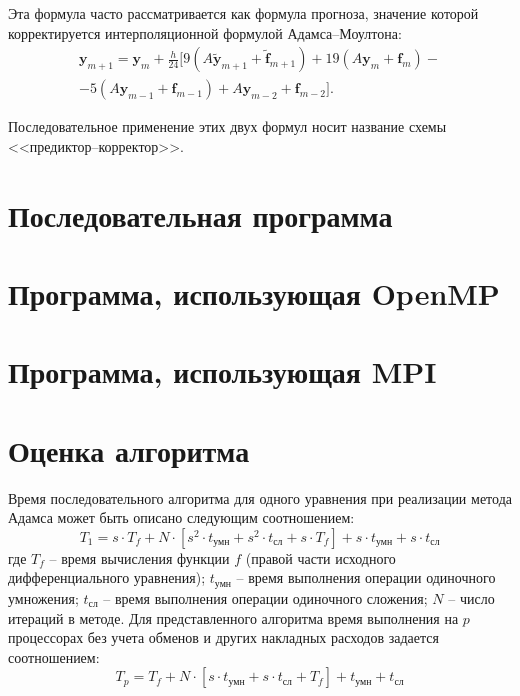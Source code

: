 \documentclass[14pt,final,titlepage,pscyr]{hedwork}
\renewcommand{\vec}[1]{\mathbf{#1}}
\begin{document}
	Эта формула часто рассматривается как формула прогноза, значение которой
	корректируется интерполяционной формулой Адамса--Моултона:
	\begin{gather*}
    \vec{y}_{m+1} = \vec{y}_m + \frac{h}{24}\big[
      9(A\widetilde{\vec{y}}_{m+1} + \widetilde{\vec{f}}_{m+1}) +
      19(A\vec{y}_m + \vec{f}_m) - \\
    - 5(A\vec{y}_{m-1} + \vec{f}_{m-1}) +
      A\vec{y}_{m-2} + \vec{f}_{m-2}\big].
  \end{gather*}
  
  Последовательное применение этих двух формул носит название схемы
  <<предиктор--корректор>>.
\newpage

\section{Последовательная программа}

\newpage

\section{Программа, использующая OpenMP}

\newpage

\section{Программа, использующая MPI}


\newpage

\section{Оценка алгоритма}
Время последовательного алгоритма для одного уравнения при реализации
метода Адамса может быть описано следующим соотношением:
\[
	T_1 = s\cdot T_f + N \cdot \left[ s^2 \cdot t_\text{умн} + s^2 \cdot t_\text{сл} + 
		s \cdot T_f \right] + s \cdot t_\text{умн} + s \cdot t_\text{сл}
\]
где \( T_f \) -- время вычисления функции \( f \) (правой части исходного
дифференциального уравнения);
\( t_\text{умн} \) -- время выполнения операции одиночного умножения;
\( t_\text{сл} \) -- время выполнения операции одиночного сложения;
\( N \) -- число итераций в методе. Для представленного алгоритма 
время выполнения на \( p \) процессорах без учета обменов и других накладных
расходов задается соотношением:
\[
	T_p = T_f + N \cdot \left[ s \cdot t_\text{умн} + s \cdot t_\text{сл} + T_f \right] + 
		t_\text{умн} + t_\text{сл}
\]
\end{document}
